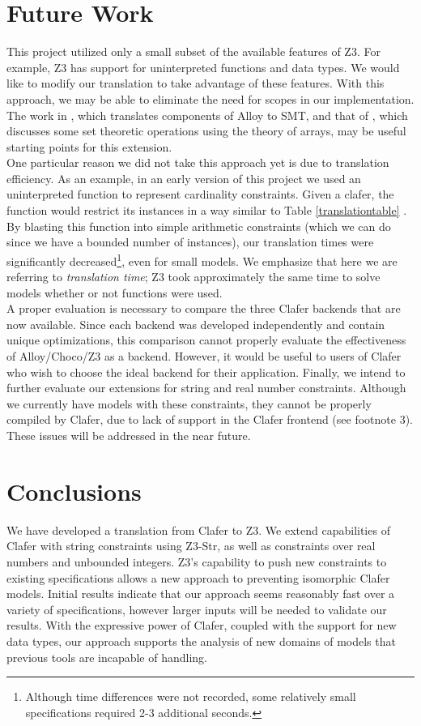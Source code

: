 \documentclass{easychair}
\begin{document}
\section{Future Work}
\label{future}
This project utilized only a small subset of the available features of Z3. For example, Z3 has support for uninterpreted functions and data types. We would like to modify our translation to take advantage of these features. With this approach, we may be able to eliminate the need for scopes in our implementation. The work in \cite{Achraf}, which translates components of Alloy to SMT, and that of \cite{Moura2009}, which discusses some set theoretic operations using the theory of arrays, may be useful starting points for this extension.\\
\indent One particular reason we did not take this approach yet is due to translation efficiency. As an example, in an early version of this project we used an uninterpreted function to represent cardinality constraints. Given a clafer, the function would restrict its instances in a way similar to Table \ref{translationtable} . By blasting this function into simple arithmetic constraints (which we can do since we have a bounded number of instances), our translation times were significantly decreased\footnote{Although time differences were not recorded, some relatively small specifications required 2-3 additional seconds.}, even for small models. We emphasize that here we are referring to \textit{translation time}; Z3 took approximately the same time to solve models whether or not functions were used.\\
\indent A proper evaluation is necessary to compare the three Clafer backends that are now available. Since each backend was developed independently and contain unique optimizations, this comparison cannot properly evaluate the effectiveness of Alloy/Choco/Z3 as a backend. However, it would be useful to users of Clafer who wish to choose the ideal backend for their application. 
\indent Finally, we intend to further evaluate our extensions for string and real number constraints. Although we currently have models with these constraints, they cannot be properly compiled by Clafer, due to lack of support in the Clafer frontend (see footnote 3). These issues will be addressed in the near future. 

\section{Conclusions}
We have developed a translation from Clafer to Z3. We extend capabilities of Clafer with string constraints using Z3-Str, as well as constraints over real numbers and unbounded integers. Z3's capability to push new constraints to existing specifications allows a new approach to preventing isomorphic Clafer models. Initial results indicate that our approach seems reasonably fast over a variety of specifications, however larger inputs will be needed to validate our results. With the expressive power of Clafer, coupled with the support for new data types, our approach supports the analysis of new domains of models that previous tools are incapable of handling. 
\end{document}
